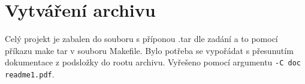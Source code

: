 \documentclass[a4paper,10pt]{article}
\begin{document}
\section{Vytváření archivu}
  Celý projekt je zabalen do souboru s příponou .tar dle zadání a to pomocí příkazu make tar v souboru Makefile.
  Bylo potřeba se vypořádat s přesunutím dokumentace z podsložky do rootu archivu. Vyřešeno pomocí argumentu \texttt{-C doc readme1.pdf}.

\nocite{*}




\newpage
\thispagestyle{empty}
\end{document}
